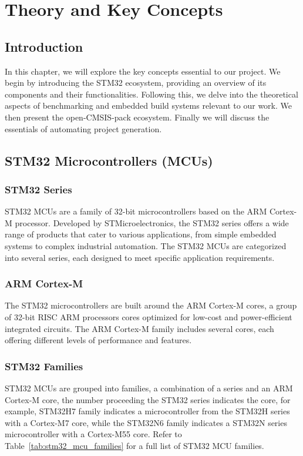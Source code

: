 
\chapter{Theory and Key Concepts}

\section*{Introduction}
In this chapter, we will explore the key concepts essential to our project. We begin by introducing the STM32 ecosystem, providing an overview of its components and their functionalities. Following this, we delve into the theoretical aspects of benchmarking and embedded build systems relevant to our work. We then present the open-CMSIS-pack ecosystem. Finally we will discuss the essentials of automating project generation.

\section{STM32 Microcontrollers (MCUs)}
\subsection{STM32 Series}
STM32 MCUs are a family of 32-bit microcontrollers based on the ARM Cortex-M processor. Developed by STMicroelectronics, the STM32 series offers a wide range of products that cater to various applications, from simple embedded systems to complex industrial automation.
The STM32 MCUs are categorized into several series, each designed to meet specific application requirements.
\subsection{ARM Cortex-M}
The STM32 microcontrollers are built around the ARM Cortex-M cores, a group of 32-bit RISC ARM processors cores optimized for low-cost and power-efficient integrated circuits.
The ARM Cortex-M family includes several cores, each offering different levels of performance and features.

\subsection{STM32 Families}
STM32 MCUs are grouped into families, a combination of a series and an ARM Cortex-M core, the number proceeding the STM32 series indicates the core, for example, STM32H7 family indicates a microcontroller from the STM32H series with a Cortex-M7 core, while the STM32N6 family indicates a STM32N series microcontroller with a Cortex-M55 core. Refer to Table~\ref{tab:stm32_mcu_families} for a full list of STM32 MCU families.
